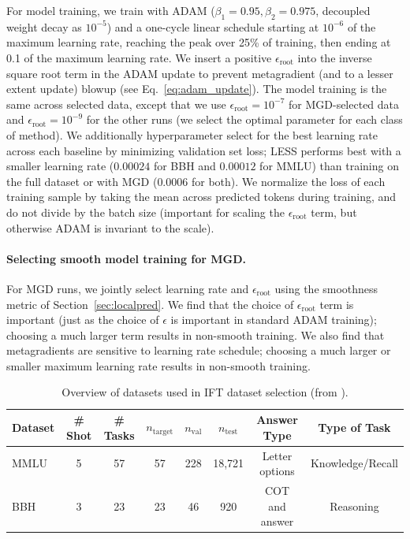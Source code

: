 For model training, we train with ADAM ($\beta_1=0.95, \beta_2=0.975$,
decoupled weight decay as $10^{-5}$) and a one-cycle linear schedule starting
at $10^{-6}$ of the maximum learning rate, reaching the peak over 25\% of
training, then ending at 0.1 of the maximum learning rate. We insert a positive
$\epsilon_\textrm{root}$ into the inverse square root term in the ADAM update
to prevent metagradient (and to a lesser extent update) blowup (see Eq.\
\ref{eq:adam_update}). The model training is the same across selected data,
except that we use $\epsilon_\textrm{root}=10^{-7}$ for MGD-selected data and
$\epsilon_\textrm{root}=10^{-9}$ for the other runs (we select the optimal
parameter for each class of method). We additionally hyperparameter select for
the best learning rate across each baseline by minimizing validation set loss;
LESS performs best with a smaller learning rate ($0.00024$ for BBH and
$0.00012$ for MMLU) than training on the full dataset or with MGD ($0.0006$ for
both). We normalize the loss of each training sample by taking the mean across
predicted tokens during training, and do not divide by the batch size
(important for scaling the $\epsilon_\mathrm{root}$ term, but otherwise ADAM is
invariant to the scale). 

\paragraph{Selecting smooth model training for MGD.} For MGD runs, we jointly
select learning rate and $\epsilon_{\mathrm{root}}$ using the smoothness metric
of Section~\ref{sec:localpred}. We find that the choice of $\epsilon_\mathrm{root}$ term
is important (just as the choice of $\epsilon$ is important in standard ADAM training); choosing a much larger term results in non-smooth training. We also find that
metagradients are sensitive to learning rate schedule; choosing a much larger or
smaller maximum learning rate results in non-smooth training.

\begin{table}[h]
    \caption{Overview of datasets used in IFT dataset selection (from \citet{xia2024less}).}
    \label{tab:datasets}
    \centering
    \begin{tabular}{lccccccc}
        \toprule
        \textbf{Dataset} & \textbf{\# Shot} & \textbf{\# Tasks} & $n_\mathrm{target}$ & $n_\mathrm{val}$  & $n_\mathrm{test}$ & \textbf{Answer Type} & \textbf{Type of Task} \\
        \midrule
        MMLU & 5 & 57 & 57 & 228 & 18,721 & Letter options & Knowledge/Recall \\
        BBH & 3 & 23 & 23 & 46 & 920 & COT and answer & Reasoning \\
        \bottomrule
    \end{tabular}
\end{table}


